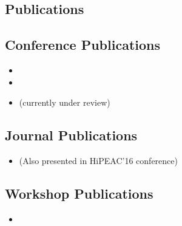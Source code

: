 
\begin{appendices}
\chapter{Publications}
\section{Conference Publications}
\begin{itemize}
	\item {}
	\item {}
	\item {} (currently under review)
\end{itemize}

\section{Journal Publications}
\begin{itemize}
				\item {} (Also presented in HiPEAC'16 conference)
\end{itemize}

\section{Workshop Publications}
\begin{itemize}
	\item {}
\end{itemize}

\end{appendices}
